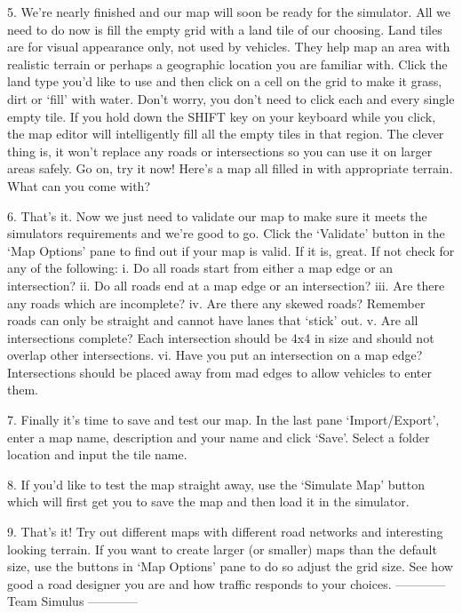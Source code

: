 \documentclass[12pt,a4paper]{article}
\begin{document}
5.	 We’re nearly finished and our map will soon be ready for the simulator.  All we need to do now is fill the empty grid with a land tile of our choosing.  Land tiles are for visual appearance only, not used by vehicles.  They help map an area with realistic terrain or perhaps a geographic location you are familiar with.
Click the land type you’d like to use and then click on a cell on the grid to make it grass, dirt or ‘fill’ with water.  Don’t worry, you don’t need to click each and every single empty tile.  If you hold down the SHIFT key on your keyboard while you click, the map editor will intelligently fill all the empty tiles in that region.  The clever thing is, it won’t replace any roads or intersections so you can use it on larger areas safely.  Go on, try it now!  
Here’s a map all filled in with appropriate terrain.  What can you come with?
 

6.	That’s it.  Now we just need to validate our map to make sure it meets the simulators requirements and we’re good to go.  Click the ‘Validate’ button in the ‘Map Options’ pane to find out if your map is valid.  If it is, great.  If not check for any of the following:
i.	Do all roads start from either a map edge or an intersection?
ii.	Do all roads end at a map edge or an intersection?
iii.	Are there any roads which are incomplete?
iv.	Are there any skewed roads?  Remember roads can only be straight and cannot have lanes that ‘stick’ out.
v.	Are all intersections complete? Each intersection should be 4x4 in size and should not overlap other intersections.
vi.	Have you put an intersection on a map edge?  Intersections should be placed away from mad edges to allow vehicles to enter them.

7.	Finally it’s time to save and test our map.  In the last pane ‘Import/Export’, enter a map name, description and your name and click ‘Save’.  Select a folder location and input the tile name.


8.	If you’d like to test the map straight away, use the ‘Simulate Map’ button which will first get you to save the map and then load it in the simulator.
 

9.	That’s it!  Try out different maps with different road networks and interesting looking terrain.  If you want to create larger (or smaller) maps than the default size, use the buttons in ‘Map Options’ pane to do so adjust the grid size. 
See how good a road designer you are and how traffic responds to your choices.
------------
Team Simulus
------------
\end{document}
